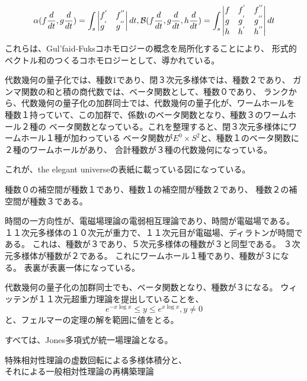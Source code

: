 \documentclass{jsarticle}
\begin{document}
     $$ \alpha(f{d \over dt},g{d \over dt}) = \int_s \begin{vmatrix}
	     f^{'} & f^{''} \\
	     g^{'} & g^{''} \end{vmatrix}dt,
	     \mathcal{B}(f{d \over dt},g{d \over dt},h{d \over dt}) =
	     \int_s \begin{vmatrix} f & f^{'} & f^{''} \\
		     g & g^{'} & g^{''} \\
	     h & h^{'} & h^{''} \end{vmatrix}dt $$
    これらは、Gul'faid-Fuksコホモロジーの概念を局所化することにより、
    形式的ベクトル和のつくるコホモロジーとして、導かれている。



        代数幾何の量子化では、種数1であり、閉３次元多様体では、種数２であり、
    ガンマ関数の和と積の商代数では、ベータ関数として、種数０であり、
    ランクから、代数幾何の量子化の加群同士では、代数幾何の量子化が、ワームホールを
    種数１持っていて、この加群で、係数tのベータ関数となり、種数３のワームホール２種の
    ベータ関数となっている。これを整理すると、閉３次元多様体にワームホール１種が加わっている
    ベータ関数が$E^{0} \times S^{2} $と、種数１のベータ関数に２種のワームホールがあり、
    合計種数が３種の代数幾何になっている。


      これが、the elegant universeの表紙に載っている図になっている。

      種数０の補空間が種数１であり、種数１の補空間が種数２であり、
      種数２の補空間が種数３である。

      時間の一方向性が、電磁場理論の電弱相互理論であり、時間が電磁場である。
      １１次元多様体の１０次元が重力で、１１次元目が電磁場、ディラトンが時間である。
      これは、種数が３であり、５次元多様体の種数が３と同型である。
      ３次元多様体が種数が２である。
      これにワームホール１種であり、種数が３になる。
      表裏が表裏一体になっている。

      代数幾何の量子化の加群同士でも、ベータ関数となり、種数が３になる。
      ウィッテンが１１次元超重力理論を提出していることを、
      $$ e^{-x \log x} \le y \le e^{x \log x}, y \neq 0 $$
      と、フェルマーの定理の解を範囲に値をとる。

      すべては、Jones多項式が統一場理論となる。

\begin{center}
\Large	特殊相対性理論の虚数回転による多様体積分と、\\
\Large それによる一般相対性理論の再構築理論
\end{center}
   
\end{document}
